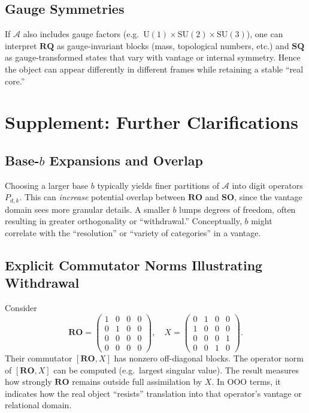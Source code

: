 \documentclass[11pt]{article}
\begin{document}
\subsection{Gauge Symmetries}
If $\mathcal{A}$ also includes gauge factors (e.g.\ $\mathrm{U}(1)\times \mathrm{SU}(2)\times \mathrm{SU}(3)$), 
one can interpret $\mathbf{RQ}$ as gauge-invariant blocks (mass, topological numbers, etc.) 
and $\mathbf{SQ}$ as gauge-transformed states that vary with vantage or internal symmetry. 
Hence the object can appear differently in different frames while retaining 
a stable “real core.”


\section{Supplement: Further Clarifications}
\label{sec:supplement}

\subsection{Base-\texorpdfstring{\(b\)}{b} Expansions and Overlap}
Choosing a larger base $b$ typically yields finer partitions of $\mathcal{A}$ 
into digit operators $P_{d,k}$. This can \emph{increase} potential overlap 
between $\mathbf{RO}$ and $\mathbf{SO}$, since the vantage domain sees 
more granular details. A smaller $b$ lumps degrees of freedom, 
often resulting in greater orthogonality or “withdrawal.” 
Conceptually, $b$ might correlate with the “resolution” or “variety of categories” 
in a vantage.

\subsection{Explicit Commutator Norms Illustrating Withdrawal}
Consider 
\[
\mathbf{RO} 
= 
\begin{pmatrix}
1 & 0 & 0 & 0\\
0 & 1 & 0 & 0\\
0 & 0 & 0 & 0\\
0 & 0 & 0 & 0
\end{pmatrix},
\quad
X 
=
\begin{pmatrix}
0 & 1 & 0 & 0\\
1 & 0 & 0 & 0\\
0 & 0 & 0 & 1\\
0 & 0 & 1 & 0
\end{pmatrix}.
\]
Their commutator $[\mathbf{RO},X]$ has nonzero off-diagonal blocks. 
The operator norm of $[\mathbf{RO},X]$ can be computed 
(e.g.\ largest singular value). The result measures how strongly 
$\mathbf{RO}$ remains outside full assimilation by $X$. 
In OOO terms, it indicates how the real object “resists” translation 
into that operator’s vantage or relational domain.
\end{document}

